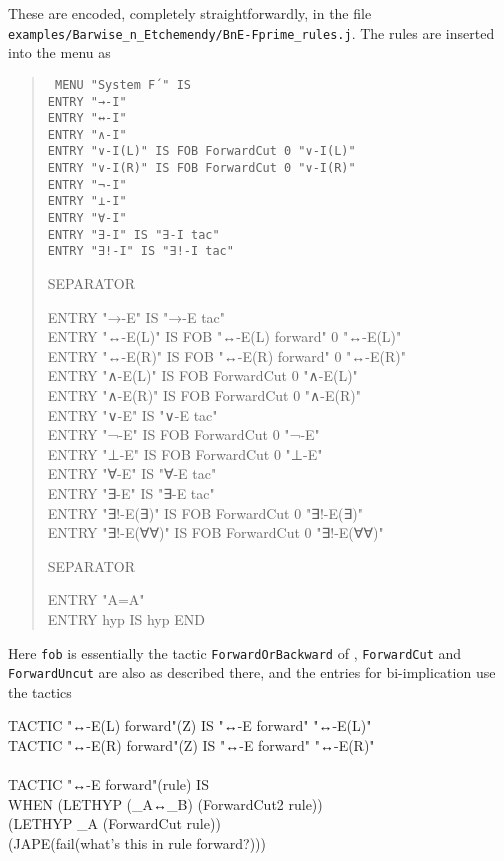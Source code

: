 These are encoded, completely straightforwardly, in the file \texttt{examples/Barwise\_n\_Etchemendy/BnE-Fprime\_rules.j}. The rules are inserted into the menu as
\begin{quote}\tt\small
MENU "System F´" IS\\
\tab ENTRY "→-I" \\
\tab ENTRY "↔-I"\\
\tab ENTRY "∧-I" \\
\tab ENTRY "∨-I(L)" IS FOB ForwardCut 0 "∨-I(L)"\\
\tab ENTRY "∨-I(R)" IS FOB ForwardCut 0 "∨-I(R)"\\
\tab ENTRY "¬-I"\\
\tab ENTRY "⊥-I"\\
\tab ENTRY "∀-I"\\
\tab ENTRY "∃-I" IS "∃-I tac"\\
\tab ENTRY "∃!-I" IS "∃!-I tac"

\tab SEPARATOR

\tab ENTRY "→-E"     IS "→-E tac" \\
\tab ENTRY "↔-E(L)"  IS FOB "↔-E(L) forward" 0 "↔-E(L)" \\
\tab ENTRY "↔-E(R)"  IS FOB "↔-E(R) forward" 0 "↔-E(R)" \\
\tab ENTRY "∧-E(L)"  IS FOB ForwardCut 0 "∧-E(L)"\\
\tab ENTRY "∧-E(R)"  IS FOB ForwardCut 0 "∧-E(R)"\\
\tab ENTRY "∨-E"     IS "∨-E tac"    \\
\tab ENTRY "¬-E"     IS FOB ForwardCut 0 "¬-E"   \\
\tab ENTRY "⊥-E"     IS FOB ForwardCut 0 "⊥-E"   \\
\tab ENTRY "∀-E"     IS "∀-E tac"    \\
\tab ENTRY "∃-E"     IS "∃-E tac"\\
\tab ENTRY "∃!-E(∃)" IS FOB ForwardCut 0 "∃!-E(∃)"\\
\tab ENTRY "∃!-E(∀∀)"    IS FOB ForwardCut 0 "∃!-E(∀∀)"

\tab SEPARATOR

\tab ENTRY "A=A"\\
\tab ENTRY hyp       IS hyp
END
\end{quote}

Here \texttt{fob} is essentially the tactic \texttt{ForwardOrBackward} of , \texttt{ForwardCut} and \texttt{ForwardUncut} are also as described there, and the entries for bi-implication use the tactics
\begin{japeish}
TACTIC "↔-E(L) forward"(Z) IS "↔-E forward" "↔-E(L)" \\
TACTIC "↔-E(R) forward"(Z) IS "↔-E forward" "↔-E(R)"\\
\\
TACTIC "↔-E forward"(rule) IS\\
\tab WHEN (LETHYP (\_A↔\_B) (ForwardCut2 rule))\\
\tab \tab (LETHYP \_A (ForwardCut rule))\\
\tab \tab (JAPE(fail(what's this in rule forward?)))
\end{japeish}


